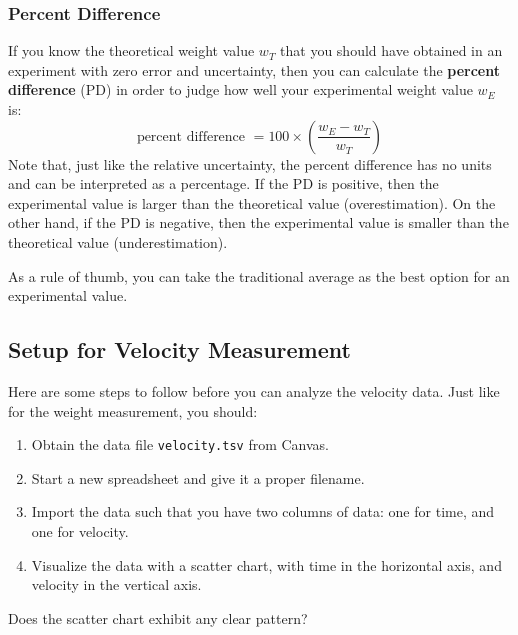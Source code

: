 \subsubsection{Percent Difference}
If you know the theoretical weight value $w_{T}$ that you should have obtained in an experiment with zero error and uncertainty, then you can calculate the \textbf{percent difference} (PD) in order to judge how well your experimental weight value $w_{E}$ is:
\begin{equation}
    \text{percent difference } = 100 \times \left( \frac{w_{E} - w_{T}}{w_{T}} \right)
    \label{eq:00.percent.diff}
\end{equation}
Note that, just like the relative uncertainty, the percent difference has no units and can be interpreted as a percentage. If the PD is positive, then the experimental value is larger than the theoretical value (overestimation). On the other hand, if the PD is negative, then the experimental value is smaller than the theoretical value (underestimation).

As a rule of thumb, you can take the traditional average as the best option for an experimental value.
\subsection{Setup for Velocity Measurement}
Here are some steps to follow before you can analyze the velocity data. Just like for the weight measurement, you should:
\begin{enumerate}
    \item Obtain the data file \texttt{velocity.tsv} from Canvas.
    \item Start a new spreadsheet and give it a proper filename.
    \item Import the data such that you have two columns of data: one for time, and one for velocity.
    \item Visualize the data with a scatter chart, with time in the horizontal axis, and velocity in the vertical axis.
\end{enumerate}
Does the scatter chart exhibit any clear pattern?
\begin{center}
\end{center}
